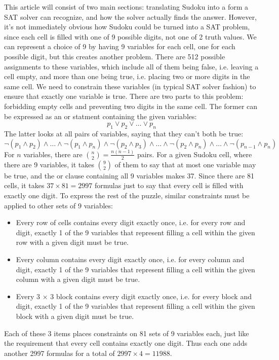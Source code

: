 \documentclass{article}
\begin{document}
This article will consist of two main sections:
translating Sudoku into a form a SAT solver can recognize,
and how the solver actually finds the answer.
However, it's not immediately obvious
how Sudoku could be turned into a SAT problem,
since each cell is filled with one of 9 possible digits,
not one of 2 truth values.
We can represent a choice of 9 by having 9 variables for each cell,
one for each possible digit,
but this creates another problem.
There are 512 possible assignments to these variables,
which include all of them being false, i.e. leaving a cell empty,
and more than one being true, i.e. placing two or more digits in the same cell.
We need to constrain these variables (in typical SAT solver fashion)
to ensure that exactly one variable is true.
There are two parts to this problem: forbidding empty cells
and preventing two digits in the same cell.
The former can be expressed as an or statment containing the given variables:
\[p_1 \lor p_2 \lor \ldots \lor p_n\]
The latter looks at all pairs of variables,
saying that they can't both be true:
\[\lnot (p_1 \land p_2) \land \ldots \land \lnot (p_1 \land p_n)
\land \lnot (p_2 \land p_3) \land \ldots \land \lnot (p_2 \land p_n) \land \ldots
\land \lnot (p_{n-1} \land p_n)\]
For $n$ variables, there are $\binom{n}{2} = \frac{n(n-1)}{2}$ pairs.
For a given Sudoku cell, where there are 9 variables,
it takes $\binom{9}{2}$ of them
to say that at most one variable may be true,
and the or clause containing all 9 variables makes 37.
Since there are 81 cells,
it takes $37 \times 81 = 2997$ formulas
just to say that every cell is filled with exactly one digit.
To express the rest of the puzzle,
similar constraints must be applied to other sets of 9 variables:
\begin{itemize}
\item
  Every row of cells contains every digit exactly once,
  i.e. for every row and digit,
  exactly 1 of the 9 variables that represent
  filling a cell within the given row with a given digit
  must be true.
\item
  Every column contains every digit exactly once,
  i.e. for every column and digit,
  exactly 1 of the 9 variables that represent
  filling a cell within the given column with a given digit
  must be true.
\item
  Every 3 $\times$ 3 block contains every digit exactly once,
  i.e. for every block and digit,
  exactly 1 of the 9 variables that represent
  filling a cell within the given block with a given digit
  must be true.
\end{itemize}
Each of these 3 items places constraints on 81 sets of 9 variables each,
just like the requirement that every cell contains exactly one digit.
Thus each one adds another 2997 formulas
for a total of $2997 \times 4 = 11988$.
\end{document}
